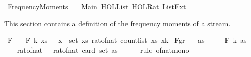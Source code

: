 %
\begin{isabellebody}%
%
%
\isadelimdocument
%
\endisadelimdocument
%
\isatagdocument
%
\isamarkuptrue%
%
\endisatagdocument
{\isafolddocument}%
%
\isadelimdocument
%
\endisadelimdocument
%
\isadelimtheory
%
\endisadelimtheory
%
\isatagtheory
{}\isamarkupfalse%
\ Frequency{\isacharunderscore}{\kern0pt}Moments\isanewline
\ \ \ Main\ HOL{\isachardot}{\kern0pt}List\ HOL{\isachardot}{\kern0pt}Rat\ List{\isacharunderscore}{\kern0pt}Ext\isanewline
{}%
\endisatagtheory
{\isafoldtheory}%
%
\isadelimtheory
%
\endisadelimtheory
%
\begin{isamarkuptext}%
This section contains a definition of the frequency moments of a stream.%
\end{isamarkuptext}\isamarkuptrue%
\isamarkupfalse%
\ F\ \isanewline
\ \ {\isachardoublequoteopen}F\ k\ xs\ {\isacharequal}{\kern0pt}\ {\isacharparenleft}{\kern0pt}{\isasymSum}\ x\ {\isasymin}\ set\ xs{\isachardot}{\kern0pt}\ {\isacharparenleft}{\kern0pt}rat{\isacharunderscore}{\kern0pt}of{\isacharunderscore}{\kern0pt}nat\ {\isacharparenleft}{\kern0pt}count{\isacharunderscore}{\kern0pt}list\ xs\ x{\isacharparenright}{\kern0pt}{\isacharcircum}{\kern0pt}k{\isacharparenright}{\kern0pt}{\isacharparenright}{\kern0pt}{\isachardoublequoteclose}\isanewline
\isanewline
{}\isamarkupfalse%
\ F{\isacharunderscore}{\kern0pt}gr{\isacharunderscore}{\kern0pt}{}{\isacharcolon}{\kern0pt}\isanewline
\ \ \ {\isachardoublequoteopen}as\ {\isasymnoteq}\ {\isacharbrackleft}{\kern0pt}{\isacharbrackright}{\kern0pt}{\isachardoublequoteclose}\isanewline
\ \ \ {\isachardoublequoteopen}F\ k\ as\ {\isachargreater}{\kern0pt}\ {}{\isachardoublequoteclose}\isanewline
%
\isadelimproof
%
\endisadelimproof
%
\isatagproof
{}\isamarkupfalse%
\ {\isacharminus}{\kern0pt}\isanewline
\ \ \isamarkupfalse%
\ {\isachardoublequoteopen}rat{\isacharunderscore}{\kern0pt}of{\isacharunderscore}{\kern0pt}nat\ {}\ {\isasymle}\ rat{\isacharunderscore}{\kern0pt}of{\isacharunderscore}{\kern0pt}nat\ {\isacharparenleft}{\kern0pt}card\ {\isacharparenleft}{\kern0pt}set\ as{\isacharparenright}{\kern0pt}{\isacharparenright}{\kern0pt}{\isachardoublequoteclose}\isanewline
\ \ \ \ \isamarkupfalse%
\ {\isacharparenleft}{\kern0pt}rule\ of{\isacharunderscore}{\kern0pt}nat{\isacharunderscore}{\kern0pt}mono{\isacharparenright}{\kern0pt}\isanewline

\end{isabellebody}
